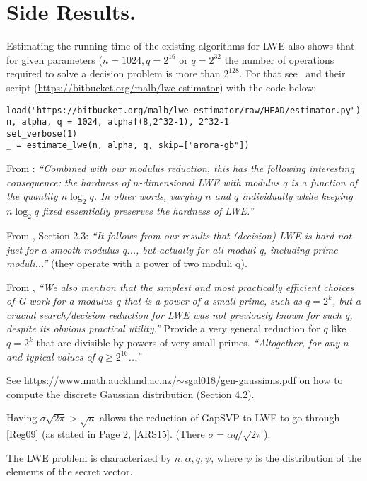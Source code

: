 \documentclass[12pt]{article}
\begin{document}
\section{Side Results.}

Estimating the running time of the existing algorithms for LWE also shows that for given parameters ($n = 1024, q = 2^{16}$ or $q = 2^{32}$ the number of operations required to solve a decision problem is more than $2^{128}$. For that see~\cite{APS15} and their script (\url{https://bitbucket.org/malb/lwe-estimator}) with the code below:
\begin{lstlisting}[frame=single]
load("https://bitbucket.org/malb/lwe-estimator/raw/HEAD/estimator.py")
n, alpha, q = 1024, alphaf(8,2^32-1), 2^32-1
set_verbose(1)
_ = estimate_lwe(n, alpha, q, skip=["arora-gb"])
\end{lstlisting}

From \cite{BLPRS13}:
\textit{``Combined with our modulus reduction, this has the following interesting consequence: the hardness of $n$-dimensional LWE with modulus $q$ is a function of the quantity $n\log_2 q$. In other words, varying $n$ and $q$ individually while keeping $n \log_2 q$ fixed essentially preserves the hardness of LWE.''}

From \cite{BLPRS13}, Section 2.3: \textit{``It follows from our results that (decision) LWE is hard not just for a smooth modulus q..., but actually for all moduli q, including prime moduli...''} (they operate with a power of two moduli q).

From \cite{MP12}, \textit{``We also mention that the simplest and most practically efficient choices of G work for a modulus q that is a power of a small prime, such as $q = 2^k$, but a crucial search/decision reduction for LWE was not previously known for such q, despite its obvious practical utility.''} Provide a very general reduction for $q$ like $q = 2^k$ that are divisible by powers of very small primes. \textit{``Altogether, for any $n$ and typical values of $q \geq 2^{16}$...''}

See https://www.math.auckland.ac.nz/$\sim$sgal018/gen-gaussians.pdf on how to compute the discrete Gaussian distribution (Section 4.2).

Having $\sigma \sqrt{2 \pi} > \sqrt{n}$ allows the reduction of GapSVP to LWE to go through [Reg09] (as stated in Page 2, [ARS15]. (There $\sigma = \alpha q / \sqrt{2 \pi}$).

The LWE problem is characterized by $n, \alpha, q, \psi$, where $\psi$ is the distribution of the elements of the secret vector.


\end{document}
